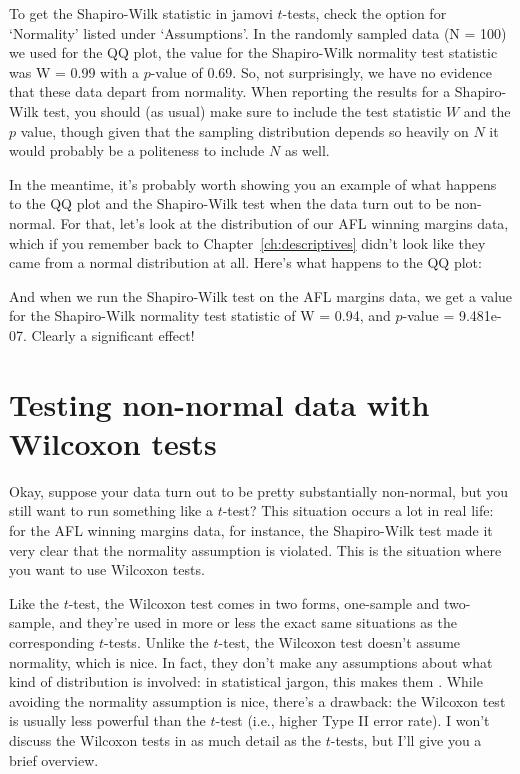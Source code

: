 To get the Shapiro-Wilk statistic in jamovi $t$-tests, check the option for `Normality' listed under `Assumptions'. In the randomly sampled data (N = 100) we used for the QQ plot, the value for the Shapiro-Wilk normality test statistic was W = 0.99 with a $p$-value of 0.69. So, not surprisingly, we have no evidence that these data depart from normality. When reporting the results for a Shapiro-Wilk test, you should (as usual) make sure to include the test statistic $W$ and the $p$ value, though given that the sampling distribution depends so heavily on $N$ it would probably be a politeness to include $N$ as well.



In the meantime, it's probably worth showing you an example of what happens to the QQ plot and the Shapiro-Wilk test when the data turn out to be non-normal. For that, let's look at the distribution of our AFL winning margins data, which if you remember back to Chapter~\ref{ch:descriptives} didn't look like they came from a normal distribution at all. Here's what happens to the QQ plot:

\begin{center}
\end{center}

And when we run the Shapiro-Wilk test on the AFL margins data, we get a value for the Shapiro-Wilk normality test statistic of W = 0.94, and $p$-value = 9.481e-07. Clearly a significant effect!


\section{Testing non-normal data with Wilcoxon tests\label{sec:wilcox}}

Okay, suppose your data turn out to be pretty substantially non-normal, but you still want to run something like a $t$-test? This situation occurs a lot in real life: for the AFL winning margins data, for instance, the Shapiro-Wilk test made it very clear that the normality assumption is violated. This is the situation where you want to use Wilcoxon tests. 

Like the $t$-test, the Wilcoxon test comes in two forms, one-sample and two-sample, and they're used in more or less the exact same situations as the corresponding $t$-tests. Unlike the $t$-test, the Wilcoxon test doesn't assume normality, which is nice. In fact, they don't make any assumptions about what kind of distribution is involved: in statistical jargon, this makes them . While avoiding the normality assumption is nice, there's a drawback: the Wilcoxon test is usually less powerful than the $t$-test (i.e., higher Type II error rate). I won't discuss the Wilcoxon tests in as much detail as the $t$-tests, but I'll give you a brief overview.


